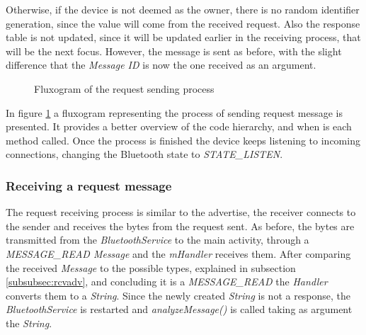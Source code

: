 Otherwise, if the device is not deemed as the owner, there is no random identifier generation, since the value will come from the received request. Also the response table is not updated, since it will be updated earlier in the receiving process, that will be the next focus. However, the message is sent as before, with the slight difference that the \textit{Message ID} is now the one received as an argument.

\begin{figure}[ht]
   \noindent{}
	\caption{\label{fig:rqtflux} Fluxogram of the request sending process}
\end{figure}

In figure \ref{fig:rqtflux} a fluxogram representing the process of sending request message is presented. It provides a better overview of the code hierarchy, and when is each method called. Once the process is finished the device keeps listening to incoming connections, changing the Bluetooth state to \textit{STATE\_LISTEN}.

\subsubsection{Receiving a request message}
\label{subsubsec:rcvrqt}

The request receiving process is similar to the advertise, the receiver connects to the sender and receives the bytes from the request sent. As before, the bytes are transmitted from the \textit{BluetoothService} to the main activity, through a \textit{MESSAGE\_READ Message} and the \textit{mHandler} receives them. After comparing the received \textit{Message} to the possible types, explained in subsection \ref{subsubsec:rcvadv}, and concluding it is a \textit{MESSAGE\_READ} the \textit{Handler} converts them to a \textit{String}. Since the newly created \textit{String} is not a response, the \textit{BluetoothService} is restarted and \textit{analyzeMessage()} is called taking as argument the \textit{String}.

